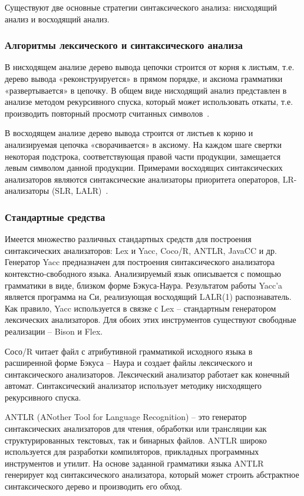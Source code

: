 Существуют две основные стратегии синтаксического анализа: нисходящий анализ и восходящий анализ.

\subsubsection{Алгоритмы лексического и синтаксического анализа}\label{subsubsec:algos}
В нисходящем анализе дерево вывода цепочки строится от корня к листьям, т.е. дерево вывода «реконструируется»
в прямом порядке, и аксиома грамматики «развертывается» в цепочку.
В общем виде нисходящий анализ представлен в анализе методом рекурсивного спуска, который может использовать откаты,
т.е. производить повторный просмотр считанных символов~\cite{aho_compilers}.

В восходящем анализе дерево вывода строится от листьев к корню и анализируемая цепочка «сворачивается» в аксиому.
На каждом шаге свертки некоторая подстрока, соответствующая правой части продукции, замещается левым символом данной продукции.
Примерами восходящих синтаксических анализаторов являются синтаксические анализаторы приоритета операторов, LR-анализаторы (SLR, LALR)~\cite{aho_compilers}.

\subsubsection{Стандартные средства}\label{subsubsec:std}
Имеется множество различных стандартных средств для построения синтаксических анализаторов: Lex и Yacc, Coco/R, ANTLR, JavaCC и др.
Генератор Yacc предназначен для построения синтаксического анализатора контекстно-свободного языка.
Анализируемый язык описывается с помощью грамматики в виде, близком форме Бэкуса-Наура.
Результатом работы Yacc'a является программа на Си, реализующая восходящий LALR(1) распознаватель.
Как правило, Yacc используется в связке с Lex – стандартным генератором лексических анализаторов.
Для обоих этих инструментов существуют свободные реализации – Bison и Flex.

Сосо/R читает файл с атрибутивной грамматикой исходного языка в расширенной форме Бэкуса – Наура и создает файлы
лексического и синтаксического анализаторов.
Лексический анализатор работает как конечный автомат.
Синтаксический анализатор использует методику нисходящего рекурсивного спуска.

ANTLR (ANother Tool for Language Recognition) – это генератор синтаксических анализаторов для чтения, обработки или
трансляции как структурированных текстовых, так и бинарных файлов.
ANTLR широко используется для разработки компиляторов, прикладных программных инструментов и утилит.
На основе заданной грамматики языка ANTLR генерирует код синтаксического анализатора, который может строить
абстрактное синтаксического дерево и производить его обход.


